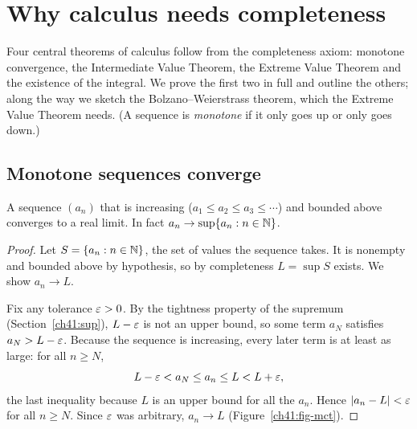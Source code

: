 \section{Why calculus needs completeness}
\label{ch41:needs}

Four central theorems of calculus follow from the completeness axiom: monotone
convergence, the Intermediate Value Theorem, the Extreme Value Theorem and the existence of the
integral. We prove the first two in full and outline the others; along the way we sketch the
Bolzano--Weierstrass theorem, which the Extreme Value Theorem needs. (A sequence is
\emph{monotone} if it only goes up or only goes down.)

\subsection*{Monotone sequences converge}

\begin{theorem}
\label{ch41:mct}
A sequence $(a_n)$ that is increasing ($a_1 \le a_2 \le a_3 \le \cdots$) and bounded above
converges to a real limit. In fact $a_n \to \sup\{a_n : n\in\mathbb{N}\}$.
\end{theorem}

\begin{proof}
Let $S = \{a_n : n\in\mathbb{N}\}$, the set of values the sequence takes. It is nonempty and
bounded above by hypothesis, so by completeness $L=\sup S$ exists. We show $a_n\to L$.

Fix any tolerance $\varepsilon>0$. By the tightness property of the supremum
(Section~\ref{ch41:sup}), $L-\varepsilon$ is not an upper bound, so some term $a_N$ satisfies
$a_N > L-\varepsilon$. Because the sequence is increasing, every later term is at least as large:
for all $n\ge N$,
\[
  L-\varepsilon < a_N \le a_n \le L < L + \varepsilon,
\]
the last inequality because $L$ is an upper bound for all the $a_n$. Hence
$\lvert a_n - L\rvert<\varepsilon$ for all $n\ge N$. Since $\varepsilon$ was arbitrary, $a_n\to L$
(Figure~\ref{ch41:fig-mct}).
\end{proof}

